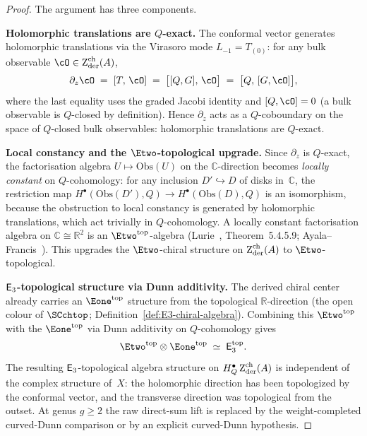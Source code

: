 \begin{proof}
The argument has three components.

\medskip\noindent
\textbf{Holomorphic translations are $Q$-exact.}
The conformal vector generates holomorphic translations via
the Virasoro mode $L_{-1} = T_{(0)}$: for any bulk observable
$\cO \in \Zder^{\mathrm{ch}}(A)$,
\begin{equation}\label{eq:dz-Q-exact}
\partial_z \cO \;=\; [T,\, \cO]
\;=\; \bigl[[Q, G],\, \cO\bigr]
\;=\; \bigl[Q,\, [G, \cO]\bigr],
\end{equation}
where the last equality uses the graded Jacobi identity and
$[Q, \cO] = 0$ (a bulk observable is $Q$-closed by definition).
Hence $\partial_z$ acts as a $Q$-coboundary on the space of
$Q$-closed bulk observables: holomorphic translations are
$Q$-exact.

\medskip\noindent
\textbf{Local constancy and the $\Etwo$-topological upgrade.}
Since $\partial_z$ is $Q$-exact, the factorisation algebra
$U \mapsto \mathrm{Obs}(U)$ on the $\mathbb{C}$-direction
becomes \emph{locally constant} on $Q$-cohomology: for any
inclusion $D' \hookrightarrow D$ of disks in~$\mathbb{C}$, the
restriction map $H^\bullet(\mathrm{Obs}(D'),Q) \to
H^\bullet(\mathrm{Obs}(D),Q)$ is an isomorphism, because the
obstruction to local constancy is generated by holomorphic
translations, which act trivially in $Q$-cohomology.
A locally constant factorisation algebra on
$\mathbb{C} \cong \mathbb{R}^2$ is an
$\Etwo^{\mathrm{top}}$-algebra
(Lurie~\cite{HA}, Theorem~5.4.5.9;
Ayala--Francis~\cite{AF15}).
This upgrades the $\Etwo$-chiral structure on
$\operatorname{Z}_{\mathrm{der}}^{\mathrm{ch}}(A)$ to $\Etwo$-topological.

\medskip\noindent
\textbf{$\mathsf{E}_3$-topological structure via Dunn additivity.}
The derived chiral center already carries an
$\Eone^{\mathrm{top}}$ structure from the topological
$\mathbb{R}$-direction (the open colour of $\SCchtop$;
Definition~\ref{def:E3-chiral-algebra}).
Combining this $\Etwo^{\mathrm{top}}$ with the
$\Eone^{\mathrm{top}}$ via Dunn additivity on $Q$-cohomology gives
\begin{equation}\label{eq:E3-top-from-dunn}
\Etwo^{\mathrm{top}} \otimes \Eone^{\mathrm{top}}
\;\simeq\; \Ethree^{\mathrm{top}}.
\end{equation}
The resulting $\mathsf{E}_3$-topological algebra structure on
$H_Q^\bullet\operatorname{Z}_{\mathrm{der}}^{\mathrm{ch}}(A)$ is independent of the complex
structure of~$X$: the holomorphic direction has been
topologized by the conformal vector, and the transverse
direction was topological from the outset. At genus $g\ge2$ the
raw direct-sum lift is replaced by the weight-completed
curved-Dunn comparison or by an explicit curved-Dunn hypothesis.
\end{proof}

